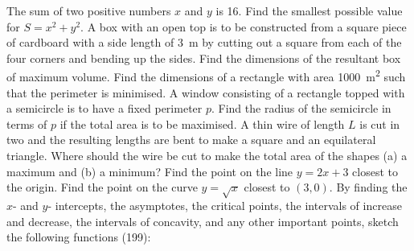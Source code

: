 \begin{questions}
  \questioM The sum of two positive numbers $ x $ and $ y $ is 16. Find the smallest possible value for $ S = x^2 + y^2 $.
  \questioM A box with an open top is to be constructed from a square piece of cardboard with a side length of \SI{3}{\metre}
            by cutting out a square from each of the four corners and bending up the sides. Find the dimensions of the resultant
            box of maximum volume.
  \questioM Find the dimensions of a rectangle with area \SI{1000}{\metre\squared} such that the perimeter is minimised.
  \questioM A window consisting of a rectangle topped with a semicircle is to have a fixed perimeter $ p $. Find the radius
            of the semicircle in terms of $ p $ if the total area is to be maximised.
  \questioE A thin wire of length $ L $ is cut in two and the resulting lengths are bent to make a square and an equilateral triangle. Where
            should the wire be cut to make the total area of the shapes (a) a maximum and (b) a minimum?
  \questioE Find the point on the line $ y = 2x + 3 $ closest to the origin.
  \questioE Find the point on the curve $ y = \sqrt{x} $ closest to $ (3, 0) $.
  \questioE By finding the $ x$- and $ y$- intercepts, the asymptotes, the critical points, the
            intervals of increase and decrease, the intervals of concavity, and any other important
            points, sketch the following functions (199):
\end{questions}
